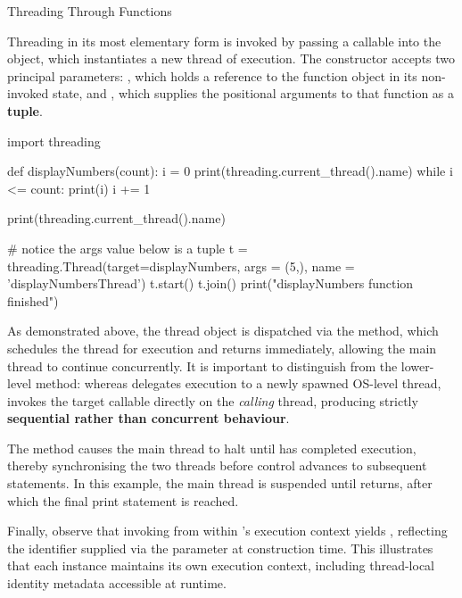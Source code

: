 \documentclass[10pt]{article}
\begin{document}
      \begin{core}[label=core:threading_function]{Threading Through Functions}

        Threading in its most elementary form is invoked by passing a callable into the  object, which instantiates a new thread of execution. The  constructor accepts two principal parameters: , which holds a reference to the function object in its non-invoked state, and , which supplies the positional arguments to that function as a \textbf{tuple}.

          \begin{pyconsole}

            import threading

            def displayNumbers(count):
                i = 0
                print(threading.current_thread().name) 
                while i <= count:
                    print(i)
                    i += 1

            print(threading.current_thread().name)

            # notice the args value below is a tuple
            t = threading.Thread(target=displayNumbers, args = (5,), name = 'displayNumbersThread') 
            t.start()
            t.join()
            print("displayNumbers function finished")

          \end{pyconsole}

        As demonstrated above, the thread object  is dispatched via the  method, which schedules the thread for execution and returns immediately, allowing the main thread to continue concurrently. It is important to distinguish  from the lower-level  method: whereas  delegates execution to a newly spawned OS-level thread,  invokes the target callable directly on the \textit{calling} thread, producing strictly \textbf{sequential rather than concurrent behaviour}.

        The  method causes the main thread to halt until  has completed execution, thereby synchronising the two threads before control advances to subsequent statements. In this example, the main thread is suspended until  returns, after which the final print statement is reached.

        Finally, observe that invoking  from within 's execution context yields , reflecting the identifier supplied via the  parameter at construction time. This illustrates that each  instance maintains its own execution context, including thread-local identity metadata accessible at runtime.

      \end{core}
\end{document}
